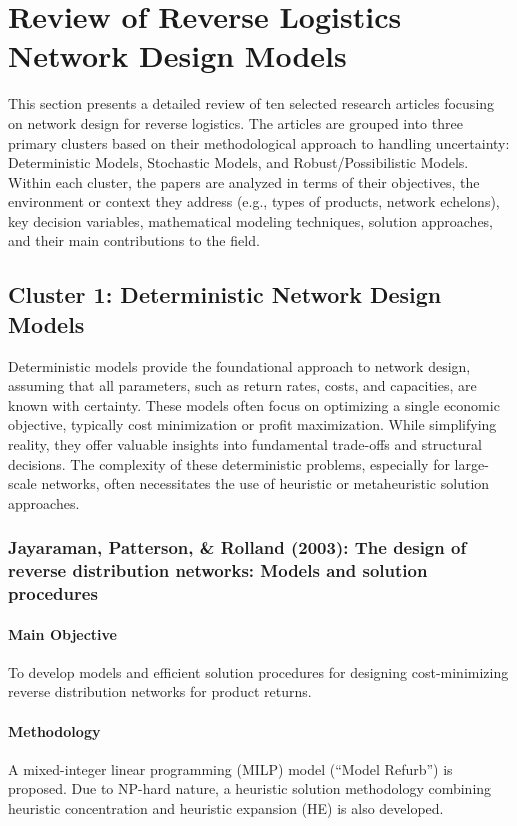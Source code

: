 \section{Review of Reverse Logistics Network Design Models}

This section presents a detailed review of ten selected research articles focusing on network design for reverse logistics. The articles are grouped into three primary clusters based on their methodological approach to handling uncertainty: Deterministic Models, Stochastic Models, and Robust/Possibilistic Models. Within each cluster, the papers are analyzed in terms of their objectives, the environment or context they address (e.g., types of products, network echelons), key decision variables, mathematical modeling techniques, solution approaches, and their main contributions to the field.

\subsection{Cluster 1: Deterministic Network Design Models}
Deterministic models provide the foundational approach to network design, assuming that all parameters, such as return rates, costs, and capacities, are known with certainty. These models often focus on optimizing a single economic objective, typically cost minimization or profit maximization. While simplifying reality, they offer valuable insights into fundamental trade-offs and structural decisions. The complexity of these deterministic problems, especially for large-scale networks, often necessitates the use of heuristic or metaheuristic solution approaches.

\subsubsection{Jayaraman, Patterson, \& Rolland (2003): The design of reverse distribution networks: Models and solution procedures}
\paragraph{Main Objective} To develop models and efficient solution procedures for designing cost-minimizing reverse distribution networks for product returns.
\paragraph{Methodology} A mixed-integer linear programming (MILP) model (``Model Refurb'') is proposed. Due to NP-hard nature, a heuristic solution methodology combining heuristic concentration and heuristic expansion (HE) is also developed.
